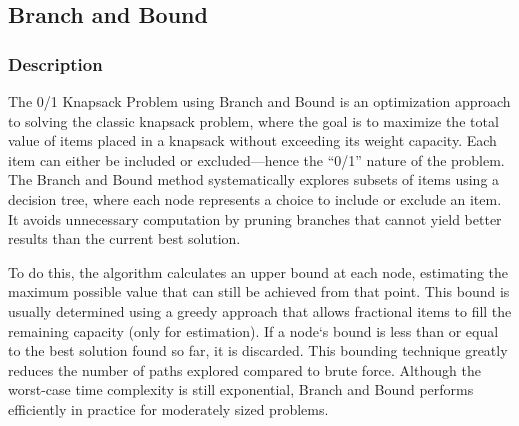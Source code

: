 \subsection{ Branch and Bound }

\subsubsection{Description}

The 0/1 Knapsack Problem using Branch and Bound is an optimization approach to solving the classic knapsack problem, where the goal is to maximize the total value of items placed in a knapsack without exceeding its weight capacity. Each item can either be included or excluded—hence the ``0/1'' nature of the problem. The Branch and Bound method systematically explores subsets of items using a decision tree, where each node represents a choice to include or exclude an item. It avoids unnecessary computation by pruning branches that cannot yield better results than the current best solution.

To do this, the algorithm calculates an upper bound at each node, estimating the maximum possible value that can still be achieved from that point. This bound is usually determined using a greedy approach that allows fractional items to fill the remaining capacity (only for estimation). If a node`s bound is less than or equal to the best solution found so far, it is discarded. This bounding technique greatly reduces the number of paths explored compared to brute force. Although the worst-case time complexity is still exponential, Branch and Bound performs efficiently in practice for moderately sized problems.

